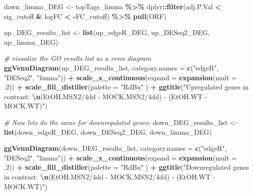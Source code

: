\documentclass[
]{book}
\newenvironment{Shaded}{\begin{snugshade}}{\end{snugshade}}
\newcommand{\AttributeTok}[1]{\textcolor[rgb]{0.13,0.29,0.53}{#1}}
\newcommand{\CommentTok}[1]{\textcolor[rgb]{0.56,0.35,0.01}{\textit{#1}}}
\newcommand{\DecValTok}[1]{\textcolor[rgb]{0.00,0.00,0.81}{#1}}
\newcommand{\FunctionTok}[1]{\textcolor[rgb]{0.13,0.29,0.53}{\textbf{#1}}}
\newcommand{\NormalTok}[1]{#1}
\newcommand{\OtherTok}[1]{\textcolor[rgb]{0.56,0.35,0.01}{#1}}
\newcommand{\SpecialCharTok}[1]{\textcolor[rgb]{0.81,0.36,0.00}{\textbf{#1}}}
\newcommand{\StringTok}[1]{\textcolor[rgb]{0.31,0.60,0.02}{#1}}
\begin{document}
\begin{Shaded}
\begin{Highlighting}[]
\NormalTok{down\_limma\_DEG }\OtherTok{\textless{}{-}}\NormalTok{ topTags\_limma }\SpecialCharTok{\%\textgreater{}\%}
\NormalTok{  dplyr}\SpecialCharTok{::}\FunctionTok{filter}\NormalTok{(adj.P.Val }\SpecialCharTok{\textless{}}\NormalTok{ sig\_cutoff }\SpecialCharTok{\&}\NormalTok{ logFC }\SpecialCharTok{\textless{}} \SpecialCharTok{{-}}\NormalTok{FC\_cutoff) }\SpecialCharTok{\%\textgreater{}\%}
  \FunctionTok{pull}\NormalTok{(ORF)}

\NormalTok{up\_DEG\_results\_list }\OtherTok{\textless{}{-}} \FunctionTok{list}\NormalTok{(up\_edgeR\_DEG,}
\NormalTok{                        up\_DESeq2\_DEG,}
\NormalTok{                        up\_limma\_DEG)}

\CommentTok{\# visualize the GO results list as a venn diagram}
\FunctionTok{ggVennDiagram}\NormalTok{(up\_DEG\_results\_list,}
              \AttributeTok{category.names =} \FunctionTok{c}\NormalTok{(}\StringTok{"edgeR"}\NormalTok{, }\StringTok{"DESeq2"}\NormalTok{, }\StringTok{"limma"}\NormalTok{)) }\SpecialCharTok{+}
  \FunctionTok{scale\_x\_continuous}\NormalTok{(}\AttributeTok{expand =} \FunctionTok{expansion}\NormalTok{(}\AttributeTok{mult =}\NormalTok{ .}\DecValTok{2}\NormalTok{)) }\SpecialCharTok{+}
  \FunctionTok{scale\_fill\_distiller}\NormalTok{(}\AttributeTok{palette =} \StringTok{"RdBu"}
\NormalTok{  ) }\SpecialCharTok{+}
  \FunctionTok{ggtitle}\NormalTok{(}\StringTok{"Upregulated genes in contrast: }\SpecialCharTok{\textbackslash{}n}\StringTok{(EtOH.MSN2/4dd {-} MOCK.MSN2/4dd) {-} (EtOH.WT {-} MOCK.WT)"}\NormalTok{)}


\CommentTok{\# Now let\textquotesingle{}s do the same for downregulated genes:}
\NormalTok{down\_DEG\_results\_list }\OtherTok{\textless{}{-}} \FunctionTok{list}\NormalTok{(down\_edgeR\_DEG,}
\NormalTok{                        down\_DESeq2\_DEG,}
\NormalTok{                        down\_limma\_DEG)}

\FunctionTok{ggVennDiagram}\NormalTok{(down\_DEG\_results\_list,}
              \AttributeTok{category.names =} \FunctionTok{c}\NormalTok{(}\StringTok{"edgeR"}\NormalTok{, }\StringTok{"DESeq2"}\NormalTok{, }\StringTok{"limma"}\NormalTok{)) }\SpecialCharTok{+}
  \FunctionTok{scale\_x\_continuous}\NormalTok{(}\AttributeTok{expand =} \FunctionTok{expansion}\NormalTok{(}\AttributeTok{mult =}\NormalTok{ .}\DecValTok{2}\NormalTok{)) }\SpecialCharTok{+}
  \FunctionTok{scale\_fill\_distiller}\NormalTok{(}\AttributeTok{palette =} \StringTok{"RdBu"}
\NormalTok{  ) }\SpecialCharTok{+}
  \FunctionTok{ggtitle}\NormalTok{(}\StringTok{"Downregulated genes in contrast: }\SpecialCharTok{\textbackslash{}n}\StringTok{(EtOH.MSN2/4dd {-} MOCK.MSN2/4dd) {-} (EtOH.WT {-} MOCK.WT)"}\NormalTok{)}
\end{Highlighting}
\end{Shaded}
\end{document}
